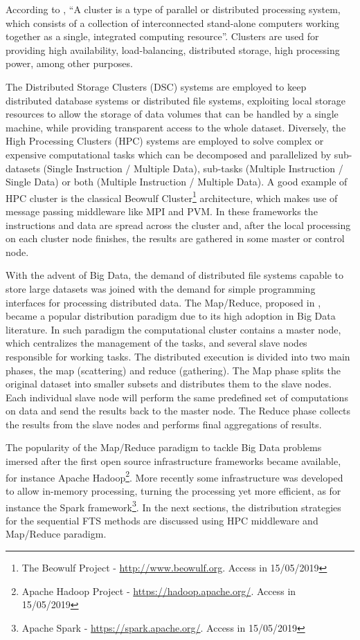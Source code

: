 According to \cite{Baker1999}, ``A cluster is a type of parallel or distributed processing system, which consists of a collection of interconnected stand-alone computers working together as a single, integrated computing resource''. Clusters are used for providing high availability, load-balancing, distributed storage, high processing power, among other purposes.

The Distributed Storage Clusters (DSC) systems are employed to keep distributed database systems or distributed file systems, exploiting local storage resources to allow the storage of data volumes that can be handled by a single machine, while providing transparent access to the whole dataset. Diversely, the High Processing Clusters (HPC) systems are employed to solve complex or expensive computational tasks which can be decomposed and parallelized by sub-datasets (Single Instruction / Multiple Data), sub-tasks (Multiple Instruction / Single Data) or both (Multiple Instruction / Multiple Data). A good example of HPC cluster is the classical Beowulf Cluster\footnote{The Beowulf Project - \url{http://www.beowulf.org}. Access in 15/05/2019} architecture, which makes use of message passing middleware like MPI and PVM. In these frameworks the instructions and data are spread across the cluster and, after the local processing on each cluster node finishes, the results are gathered in some master or control node. 

With the advent of Big Data, the demand of distributed file systems capable to store large datasets was joined with the demand for simple programming interfaces for processing distributed data. The Map/Reduce, proposed in \cite{Dean2008}, became a popular distribution paradigm due to its high adoption in Big Data literature. In such paradigm the computational cluster contains a master node, which centralizes the management of the tasks, and several slave nodes responsible for working tasks. The distributed execution is divided into two main phases, the map (scattering) and reduce (gathering). The Map phase splits the original dataset into smaller subsets and distributes them to the slave nodes. Each individual slave node will perform the same predefined set of computations on data and send the results back to the master node. The Reduce phase collects the results from the slave nodes and performs final aggregations of results.

The popularity of the Map/Reduce paradigm to tackle Big Data problems imersed after the first open source infrastructure frameworks became available, for instance Apache Hadoop\footnote{Apache Hadoop Project - \url{https://hadoop.apache.org/}. Access in 15/05/2019}. More recently some infrastructure was developed to allow in-memory processing, turning the processing yet more efficient, as for instance the Spark framework\footnote{Apache Spark - \url{https://spark.apache.org/}. Access in 15/05/2019}. In the next sections, the distribution strategies for the sequential FTS methods are discussed using HPC middleware and Map/Reduce paradigm.



